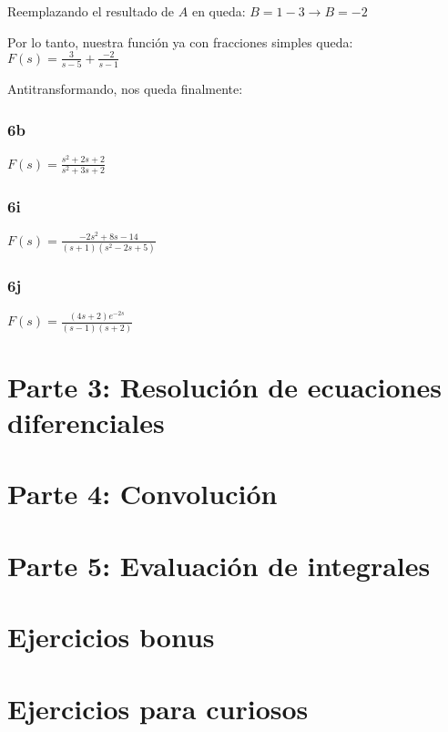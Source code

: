 \documentclass[11pt]{article}
\newcommand*\circled[1]{\tikz[baseline=(char.base)]{
		\node[shape=circle,draw,inner sep=2pt] (char) {#1};}}
\begin{document}
	Reemplazando el resultado de $A$ en \circled{1} queda: $B=1-3\rightarrow \boxed{B=-2}$
	
	Por lo tanto, nuestra función ya con fracciones simples queda: $\displaystyle F(s)=\frac{3}{s-5}+\frac{-2}{s-1}$
	
	Antitransformando, nos queda finalmente: 
	\subsubsection{6b}
	$\displaystyle F(s)=\frac{s^{2}+2s+2}{s^{2}+3s+2}$
	
	\subsubsection{6i}
	$\displaystyle F(s)=\frac{-2s^{2}+8s-14}{(s+1)(s^{2}-2s+5)}$
	
	\subsubsection{6j}
	$\displaystyle F(s)=\frac{(4s+2)e^{-2s}}{(s-1)(s+2)}$
	
	\section{Parte 3: Resolución de ecuaciones diferenciales}
	\section{Parte 4: Convolución}
	\section{Parte 5: Evaluación de integrales}
	\section{Ejercicios bonus}
	\section{Ejercicios para curiosos}
\end{document}
